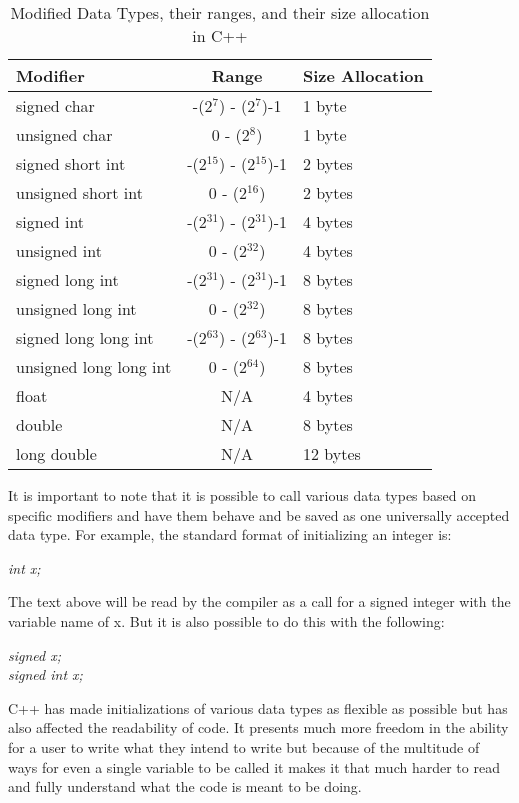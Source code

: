 \documentclass[12pt]{article}
\begin{document}
\begin{table}[h!]
  \begin{center}
    \caption{Modified Data Types, their ranges, and their size allocation in C++}
    \label{table:DT2}
    \begin{tabular}{|l|c|l|}
      \toprule %
      \textbf{Modifier} & \textbf{Range} & \textbf{Size Allocation}\\
      \midrule %
      signed char & -(2$^7$) - (2$^7$)-1 & 1 byte \\ 
      \hline
      unsigned char & 0 - (2$^8$) & 1 byte \\
      \hline
      signed short int & -(2$^15$) - (2$^15$)-1 & 2 bytes \\
      \hline
      unsigned short int & 0 - (2$^16$) & 2 bytes \\
      \hline
      signed int & -(2$^31$) - (2$^31$)-1 & 4 bytes\\
      \hline
      unsigned int & 0 - (2$^32$) & 4 bytes\\
      \hline
      signed long int & -(2$^31$) - (2$^31$)-1 & 8 bytes\\
      \hline
      unsigned long int & 0 - (2$^32$) & 8 bytes\\
      \hline
      signed long long int & -(2$^63$) - (2$^63$)-1 & 8 bytes\\
      \hline
      unsigned long long int & 0 - (2$^64$) & 8 bytes\\
      \hline
      float & N/A & 4 bytes\\
      \hline
      double & N/A & 8 bytes \\
      \hline
      long double & N/A & 12 bytes \\
      \bottomrule
    \end{tabular}
  \end{center}
\end{table}

It is important to note that it is possible to call various data types based on specific modifiers and have them behave and be saved as one universally accepted data type. For example, the standard format of initializing an integer is: \\ 
\begin{center}
  \textit{int x;}
\end{center}
The text above will be read by the compiler as a call for a signed integer with the variable name of x. But it is also possible to do this with the following:\\
\begin{center}
  \textit{signed x;\\signed int x;}
\end{center}
C++ has made initializations of various data types as flexible as possible but has also affected the readability of code. It presents much more freedom in the ability for a user to write what they intend to write but because of the multitude of ways for even a single variable to be called it makes it that much harder to read and fully understand what the code is meant to be doing.
\end{document}
